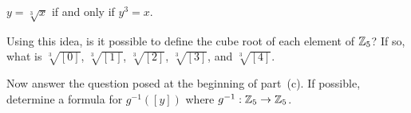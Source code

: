\begin{center}
$y = \sqrt[3]{x}$ if and only if $y^3 = x$.
\end{center}

Using this idea, is it possible to define the cube root of each element of $\mathbb{Z}_5$?  If so, what is 
$\sqrt[3]{[0]}$, $\sqrt[3]{[1]}$, $\sqrt[3]{[2]}$, $\sqrt[3]{[3]}$, and $\sqrt[3]{[4]}$.

\item Now answer the question posed at the beginning of part~(c).  If possible, determine a formula for $g^{-1}\left([y] \right)$ where $g^{-1}: \mathbb{Z}_5 \to \mathbb{Z}_5$.
\ea

\begin{comment}

\ExerciseSolution

\ba
\item As a set of ordered pairs, $f = \{(([0],[4]), ([1],[0]), ([2], [3]), ([3],[3]), ([4], [0])\}$. The inverse of $f$ is then $\{([4],[0]), ([0], [1]), ([3], [2]), ([3],[3]), ([0], [4])\}$. The inverse is not a function because both $([3], [2])$ and $([3],[3])$ are in $f^{-1}$. 

\item As a set of ordered pairs, $g = \{(([0],[4]), ([1],[0]), ([2], [2]), ([3],[1]), ([4], [3])\}$. The inverse of $g$ is then $\{([4],[0]), ([0], [1]), ([2], [2]), ([1],[3]), ([3], [4])\}$. Since there are no distinct ordered pairs in $g^{-1}$ with the same first entry, we see that $g^{-1}$ is a function.

\item Evaluating $g^3$ for every input gives us 
\begin{center}
\begin{tabular}{l|cccccc}
$[x]$			&$[0]$	&$[1]$	&$[2]$	&$[3]$	&$[4]$ \\
$[x]^3$		&$[0]$	&$[1]$	&$[3]$	&$[2]$	&$[4]$ \\
\end{tabular}
\end{center}
Therefore,
\[\sqrt[3]{[0]} = [0],  \sqrt[3]{[1]} = [1], \sqrt[3]{[2]}=[3], \sqrt[3]{[3]} = [2], \text{ and } \sqrt[3]{[4]} = [4].\]

\item Algebraically, $g^{-1}([y]) = [x]$ if $[y^3 + 4] = [x]$. Solving for $y$ yields $[y] = \sqrt[3]{[x-4]}$. So $g^{-1}([y]) = \sqrt[3]{[y-4]}$. We can compare with the collection of ordered pairs in part (b):
\begin{align*}
g^{-1}([0]) &= \sqrt[3]{[-4]} = \sqrt[3]{[1]} = [1] \\
g^{-1}([1]) &= \sqrt[3]{[-3]} = \sqrt[3]{[2]} = [3] \\
g^{-1}([2]) &= \sqrt[3]{[-2]} = \sqrt[3]{[3]} = [2] \\
g^{-1}([3]) &= \sqrt[3]{[-1]} = \sqrt[3]{[4]} = [4] \\
g^{-1}([4]) &= \sqrt[3]{[0]} =  [0]
\end{align*}
as expected.

\ea


\end{comment}

